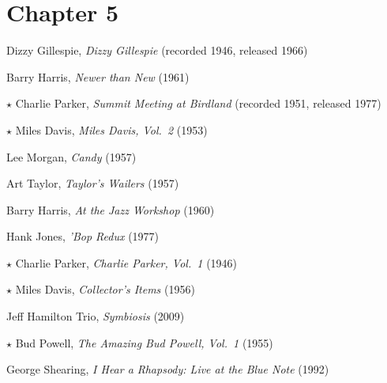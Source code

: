 \section*{Chapter 5}

\vspace{-1em}
\begin{compactitem}
  \item Dizzy Gillespie, \emph{Dizzy Gillespie} (recorded 1946, released 1966)
  \item Barry Harris, \emph{Newer than New} (1961)
  \item[$\star$] Charlie Parker, \emph{Summit Meeting at Birdland} (recorded
    1951, released 1977)
\end{compactitem}
\nocite{parker:summit,gillespie:vintage,harris:newer}

\begin{compactitem}
  \item[$\star$] Miles Davis, \emph{Miles Davis, Vol.~2} (1953)
  \item Lee Morgan, \emph{Candy} (1957)
  \item Art Taylor, \emph{Taylor's Wailers} (1957)
\end{compactitem}
\nocite{davis:vol2,morgan:candy,taylor:wailers}

\begin{compactitem}
  \item Barry Harris, \emph{At the Jazz Workshop} (1960)
  \item Hank Jones, \emph{'Bop Redux} (1977)
  \item[$\star$] Charlie Parker, \emph{Charlie Parker, Vol.~1} (1946)
\end{compactitem}
\nocite{parker:vol1,harris:workshop,jones:bopredux}

\begin{compactitem}
  \item[$\star$] Miles Davis, \emph{Collector's Items} (1956)
  \item Jeff Hamilton Trio, \emph{Symbiosis} (2009)
\end{compactitem}
\nocite{davis:collectors,hamilton:symbiosis}

\begin{compactitem}
  \item[$\star$] Bud Powell, \emph{The Amazing Bud Powell, Vol.~1} (1955)
  \item George Shearing, \emph{I Hear a Rhapsody: Live at the Blue Note} (1992)
\end{compactitem}
\nocite{powell:amazing1,shearing:rhapsody}


\clearpage



